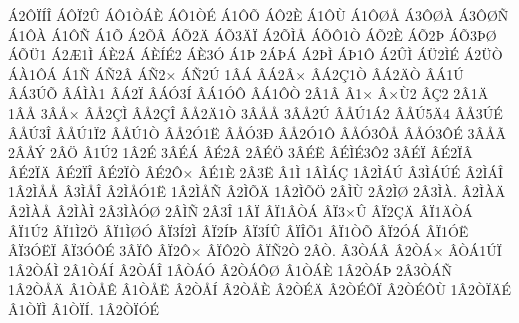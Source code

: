 {^^c12^^d4^^cf^^cd^^ce
^^c1^^d4^^cf2^^db
^^c1^^d41^^d2^^c1^^c8
^^c1^^d41^^d2^^c9
^^c11^^d4^^d5
^^c1^^d42^^c8
^^c11^^d4^^d9
^^c11^^d4^^d8^^c5
^^c13^^d4^^d8^^c0
^^c13^^d4^^d8^^d1
^^c11^^d4^^c0
^^c11^^d4^^d1
^^c11^^d5
^^c12^^d5^^c2
^^c1^^d52^^c4
^^c1^^d53^^c4^^cf
^^c12^^d5^^cc^^c5
^^c1^^d5^^d41^^d2
^^c1^^d52^^c8
^^c1^^d52^^de
^^c1^^d53^^de^^d8
^^c1^^d5^^dc1
^^c12^^c61^^cc
^^c1^^c82^^c1
^^c1^^c8^^cd^^c92
^^c1^^c83^^d3
^^c11^^de
2^^c1^^de^^c1
^^c12^^de^^cc
^^c1^^de1^^d4
^^c12^^db^^cc
^^c1^^dc2^^cc^^c9
^^c12^^dc^^d2
^^c1^^c01^^d4^^c1
^^c11^^d1
^^c1^^d12^^c2
^^c1^^d12^^d7
^^c1^^d12^^da
1^^c2^^c1
^^c2^^c12^^c2^^d7
^^c2^^c12^^c71^^d2
^^c2^^c12^^c4^^d2
^^c2^^c11^^da
^^c2^^c13^^da^^d5
^^c2^^c1^^cc^^c01
^^c2^^c12^^cf
^^c2^^c1^^d33^^cd
^^c2^^c11^^d3^^d4
^^c2^^c11^^d4^^d2
2^^c21^^c2
^^c21^^d7
^^c2^^d7^^d92
^^c2^^c72
2^^c21^^c4
1^^c2^^c5
3^^c2^^c5^^d7
^^c2^^c52^^c7^^cc
^^c2^^c52^^c7^^ce
^^c2^^c52^^c41^^d2
3^^c2^^c5^^c5
3^^c2^^c52^^da
^^c2^^c5^^da1^^c12
^^c2^^c5^^da5^^c44
^^c2^^c53^^da^^c9
^^c2^^c5^^da3^^ce
^^c2^^c5^^da1^^cf2
^^c2^^c5^^da1^^d2
^^c2^^c52^^d31^^cb
^^c2^^c5^^d33^^d0
^^c2^^c52^^d31^^d4
^^c2^^c5^^d33^^d4^^c5
^^c2^^c5^^d33^^d4^^c9
3^^c2^^c5^^c3
2^^c2^^c5^^dd
2^^c2^^d6
^^c21^^da2
1^^c22^^c9
3^^c2^^c9^^c1
^^c2^^c92^^c2
2^^c2^^c9^^d6
3^^c2^^c9^^cb
^^c2^^c9^^cc^^c93^^d42
3^^c2^^c9^^cf
^^c2^^c92^^cf^^c2
^^c2^^c92^^cf^^c4
^^c2^^c92^^cf^^ce
^^c2^^c92^^cf^^d2
^^c2^^c92^^d4^^d7
^^c2^^c91^^c8
2^^c23^^cb
^^c21^^cc
1^^c2^^cc^^c1^^c7
1^^c22^^cc^^c1^^da
^^c23^^cc^^c1^^da^^c9
^^c22^^cc^^c1^^ce
1^^c22^^cc^^c5^^c5
^^c23^^cc^^c5^^ce
^^c22^^cc^^c5^^d31^^cb
1^^c22^^cc^^c5^^d1
^^c22^^cc^^d5^^c4
1^^c22^^cc^^d5^^d6
2^^c2^^cc^^d9
2^^c22^^cc^^d8
2^^c23^^cc^^c0.
^^c22^^cc^^c0^^c4
^^c22^^cc^^c0^^c5
^^c22^^cc^^c0^^cc
2^^c23^^cc^^c0^^d3^^d8
2^^c2^^cc^^d1
2^^c23^^ce
1^^c2^^cf
^^c2^^cf1^^c2^^d2^^c1
^^c2^^cf3^^d7^^db
^^c2^^cf2^^c7^^c4
^^c2^^cf1^^c4^^d2^^c1
^^c2^^cf1^^da2
^^c2^^cf1^^cc2^^d6
^^c2^^cf1^^cc^^d8^^d3
^^c2^^cf3^^cd2^^cc
^^c2^^cf2^^cd^^de
^^c2^^cf3^^cd^^db
^^c2^^cf^^ce^^d51
^^c2^^cf1^^d2^^d5
^^c2^^cf2^^d3^^c1
^^c2^^cf1^^d3^^cb
^^c2^^cf3^^d3^^cb^^cf
^^c2^^cf3^^d3^^d4^^c9
3^^c2^^cf^^d4
^^c2^^cf2^^d4^^d7
^^c2^^cf^^d42^^d2
^^c2^^cf^^d12^^d2
2^^c2^^d2.
^^c23^^d2^^c1^^c2
^^c22^^d2^^c1^^d7
^^c2^^d2^^c11^^da^^cf
1^^c22^^d2^^c1^^cc
2^^c21^^d2^^c1^^cd
^^c22^^d2^^c1^^ce
1^^c2^^d2^^c1^^d3
^^c22^^d2^^c1^^d4^^d8
^^c21^^d2^^c1^^c8
1^^c22^^d2^^c1^^de
2^^c23^^d2^^c1^^d1
1^^c22^^d2^^c5^^c4
^^c21^^d2^^c5^^ca
^^c21^^d2^^c5^^cb
^^c22^^d2^^c5^^cd
^^c22^^d2^^c5^^c8
^^c22^^d2^^c9^^c4
^^c22^^d2^^c9^^d4^^cf
^^c22^^d2^^c9^^d4^^d9
1^^c22^^d2^^cf^^c4^^c9
^^c21^^d2^^cf^^cc
^^c21^^d2^^cf^^cd.
1^^c22^^d2^^cf^^d3^^c9
}

